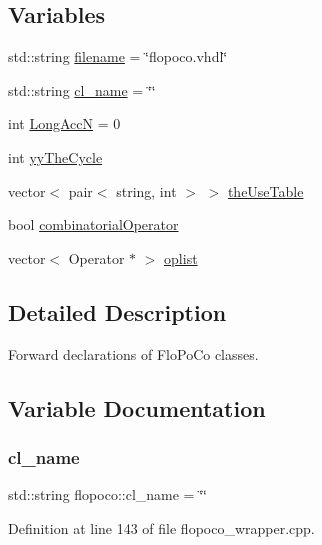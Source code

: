 \subsection*{Variables}
\begin{DoxyCompactItemize}
\item 
std\+::string \hyperlink{namespaceflopoco_a5c4225423306558917cdb1506c97276c}{filename} = \char`\"{}flopoco.\+vhdl\char`\"{}
\item 
std\+::string \hyperlink{namespaceflopoco_a5dea3870f6c302d9aac934a2294f9f46}{cl\+\_\+name} = \char`\"{}\char`\"{}
\item 
int \hyperlink{namespaceflopoco_a6873f9454d8fc367f2e8c34d37b2b9fe}{Long\+AccN} = 0
\item 
int \hyperlink{namespaceflopoco_a9b076879d9e99dc16fb742bd751cb684}{yy\+The\+Cycle}
\item 
vector$<$ pair$<$ string, int $>$ $>$ \hyperlink{namespaceflopoco_ada22628e014742301d4944e1b54aaa73}{the\+Use\+Table}
\item 
bool \hyperlink{namespaceflopoco_abc755afc329d2566c53663b02f29391b}{combinatorial\+Operator}
\item 
vector$<$ Operator $\ast$ $>$ \hyperlink{namespaceflopoco_a7b47e1bd087ebaa2cfe3b19d485ac16b}{oplist}
\end{DoxyCompactItemize}


\subsection{Detailed Description}
Forward declarations of Flo\+Po\+Co classes. 

\subsection{Variable Documentation}
\mbox{\label{namespaceflopoco_a5dea3870f6c302d9aac934a2294f9f46}} 
\subsubsection{\texorpdfstring{cl\+\_\+name}{cl\_name}}
{\footnotesize\ttfamily std\+::string flopoco\+::cl\+\_\+name = \char`\"{}\char`\"{}}



Definition at line 143 of file flopoco\+\_\+wrapper.\+cpp.

